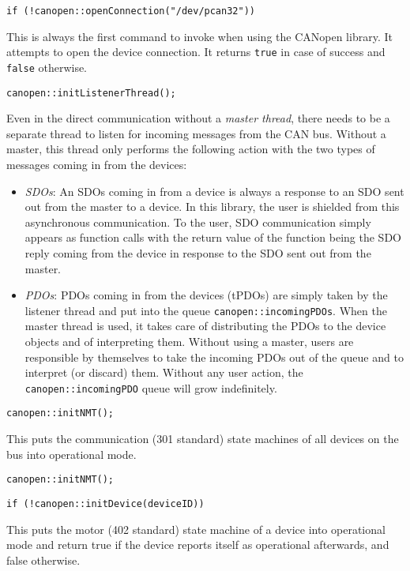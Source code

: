\begin{verbatim}
if (!canopen::openConnection("/dev/pcan32"))
\end{verbatim}
This is always the first command to invoke when using the CANopen library. It attempts to open the device connection. It returns \texttt{true} in case of success and \texttt{false} otherwise.

\begin{verbatim}
canopen::initListenerThread();
\end{verbatim}
Even in the direct communication without a {\em master thread}, there needs to be a separate thread to listen for incoming messages from the CAN bus. Without a master, this thread only performs the following action with the two types of messages coming in from the devices:
\begin{itemize}
\item {\em SDOs}: An SDOs coming in from a device is always a response to an SDO sent out from the master to a device. In this library, the user is shielded from this asynchronous communication. To the user, SDO communication simply appears as function calls with the return value of the function being the SDO reply coming from the device in response to the SDO sent out from the master. 
\item {\em PDOs}: PDOs coming in from the devices (tPDOs) are simply taken by the listener thread and put into the queue \texttt{canopen::incomingPDOs}. When the master thread is used, it takes care of distributing the PDOs to the device objects and of interpreting them. Without using a master, users are responsible by themselves to take the incoming PDOs out of the queue and to interpret (or discard) them. Without any user action, the \texttt{canopen::incomingPDO} queue will grow indefinitely.
\end{itemize}

\begin{verbatim}
canopen::initNMT();
\end{verbatim}
This puts the communication (301 standard) state machines of all devices on the bus into operational mode.

\begin{verbatim}
canopen::initNMT();
\end{verbatim}

\begin{verbatim}
if (!canopen::initDevice(deviceID))
\end{verbatim}
This puts the motor (402 standard) state machine of a device into operational mode and return true if the device reports itself as operational afterwards, and false otherwise.


